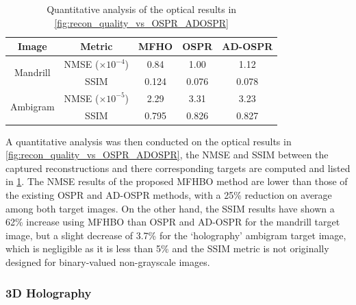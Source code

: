 	\begin{table}[H]
	\centering
	\begin{tabular}{|c|c|c|c|c|}
	\hline
	\textbf{Image}              & \textbf{Metric}    & \textbf{MFHO}  & \textbf{OSPR}  & \textbf{AD-OSPR} \\ \hline
	\multirow{2}{*}{Mandrill}   & NMSE ($\times 10^{-4}$) & 0.84      & 1.00           & 1.12             \\ \cline{2-5} 
								& SSIM               & 0.124          & 0.076          & 0.078            \\ \hline
	\multirow{2}{*}{Ambigram}   & NMSE ($\times 10^{-5}$) & 2.29      & 3.31           & 3.23             \\ \cline{2-5} 
								& SSIM               & 0.795          & 0.826          & 0.827            \\ \hline
	\end{tabular}
	\caption{Quantitative analysis of the optical results in \cref{fig:recon_quality_vs_OSPR_ADOSPR}}
	\label{tab:quantitative_vs_OSPR_ADOSPR}
	\end{table}
	
	A quantitative analysis was then conducted on the optical results in \cref{fig:recon_quality_vs_OSPR_ADOSPR}, the NMSE and SSIM between the captured reconstructions and there corresponding targets are computed and listed in \cref{tab:quantitative_vs_OSPR_ADOSPR}. The NMSE results of the proposed MFHBO method are lower than those of the existing OSPR and AD-OSPR methods, with a 25\% reduction on average among both target images. On the other hand, the SSIM results have shown a 62\% increase using MFHBO than OSPR and AD-OSPR for the mandrill target image, but a slight decrease of 3.7\% for the `holography' ambigram target image, which is negligible as it is less than 5\% and the SSIM metric is not originally designed for binary-valued non-grayscale images.
	
\subsubsection{3D Holography}
	
